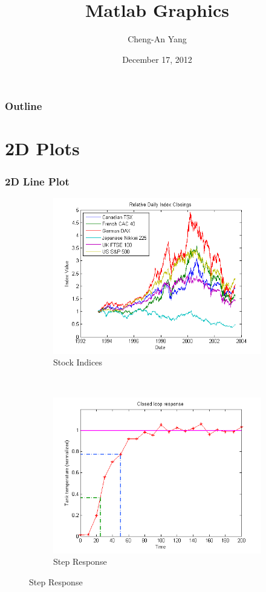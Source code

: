 \documentclass{beamer}  %
\title{Matlab Graphics}
\author{Cheng-An Yang}
\institute{UCLA HSSEAS Workshop}
\date{December 17, 2012}  %
\begin{document}
\frame{\titlepage}
\begin{frame}
\frametitle{Outline}
\tableofcontents[pausesections]
\end{frame}
\section{2D Plots}
\begin{frame}
\frametitle{2D Line Plot}

\begin{figure}
        \begin{subfigure}[b]{0.4\textwidth}
                \centering
                \includegraphics[width=\textwidth]{Line_Plot_2D_2_01.png}
                \caption{Stock Indices\cite{matlab_gallery} }
        \end{subfigure}%
        ~
        \begin{subfigure}[b]{0.4\textwidth}
                \centering
                \includegraphics[width=\textwidth]{Add_Lines_to_Plot_1_01.png}
                \caption{Step Response\cite{matlab_gallery}}
        \end{subfigure}
\end{figure}

  
\end{frame}
\end{document}
